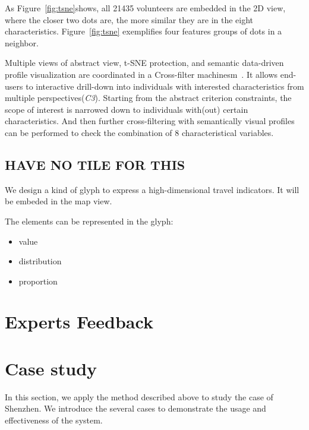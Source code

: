 As Figure~\ref{fig:tsne}shows, all 21435 volunteers are embedded in the 2D view, where the closer two dots are, the more similar they are in the eight characteristics. Figure~\ref{fig:tsne} exemplifies four features groups of dots in a neighbor.

Multiple views of abstract view, t-SNE protection, and semantic data-driven profile visualization are coordinated in a Cross-filter machinesm~\citep{Weaver2010}. It allows end-users to interactive drill-down into individuals with interested characteristics from multiple perspectives(\textit{C3}). Starting from the abstract criterion constraints, the scope of interest is narrowed down to individuals with(out) certain characteristics. And then further cross-filtering with semantically visual profiles can be performed to check the combination of 8 characteristical variables.


\subsection{HAVE NO TILE FOR THIS}
We design a kind of glyph to express a high-dimensional travel indicators. It will be embeded in the map view. 

The elements can be represented in the glyph:
\begin{itemize}
  \item value
  \item distribution
  \item proportion
\end{itemize}



\section{Experts Feedback}



\section{Case study}

In this section, we apply the method described above to study the case of Shenzhen. We introduce the several cases to demonstrate the usage and effectiveness of the system.


